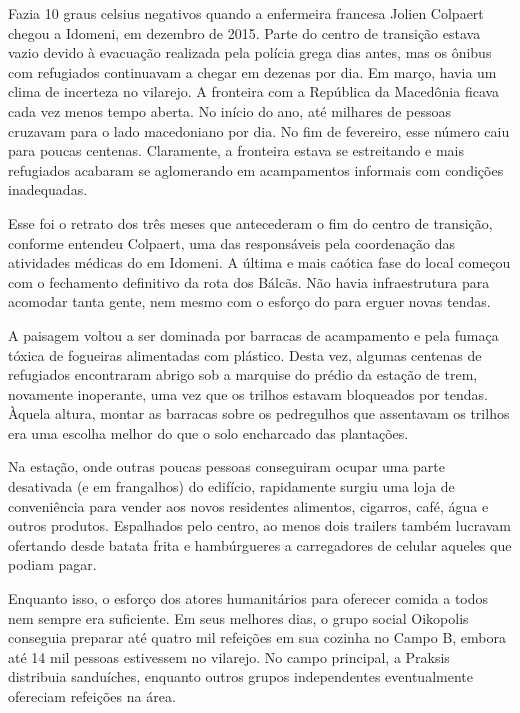 \putodd{}
\clearpage
{}
 

Fazia 10 graus celsius negativos quando a enfermeira francesa Jolien
Colpaert chegou a Idomeni, em dezembro de 2015. Parte do centro de
transição estava vazio devido à evacuação realizada pela polícia grega
dias antes, mas os ônibus com refugiados continuavam a chegar em dezenas
por dia. Em março, havia um clima de incerteza no vilarejo. 
A fronteira com a República da Macedônia ficava cada vez menos
tempo aberta. No início do ano, até milhares de pessoas cruzavam para o
lado macedoniano por dia. No fim de fevereiro, esse número caiu para
poucas centenas. Claramente, a fronteira estava se estreitando e mais
refugiados acabaram se aglomerando em acampamentos informais com
condições inadequadas.

Esse foi o retrato dos três meses que antecederam o fim do centro de
transição, conforme entendeu Colpaert, uma das responsáveis pela coordenação das
atividades médicas do  em Idomeni. A última e mais
caótica fase do local começou com o fechamento definitivo da rota
dos Bálcãs. Não havia infraestrutura para acomodar tanta gente, nem
mesmo com o esforço do  para erguer novas tendas.

A paisagem voltou a ser dominada por barracas de acampamento e pela
fumaça tóxica de fogueiras alimentadas com plástico. Desta
vez, algumas centenas de refugiados encontraram abrigo sob a marquise do
prédio da estação de trem, novamente inoperante, uma vez que os trilhos
estavam bloqueados por tendas. Àquela altura, montar as barracas sobre os pedregulhos que assentavam os trilhos era uma escolha melhor do que o solo encharcado das plantações. 

Na estação, onde outras poucas pessoas conseguiram ocupar uma parte
desativada (e em frangalhos) do edifício, rapidamente surgiu uma loja de
conveniência para vender aos novos residentes alimentos, cigarros, café,
água e outros produtos. Espalhados pelo centro, ao menos dois
trailers também lucravam ofertando desde batata frita e hambúrgueres a
carregadores de celular aqueles que podiam pagar.

Enquanto isso, o esforço dos atores humanitários para oferecer comida a todos
nem sempre era suficiente. Em seus melhores dias, o grupo social
Oikopolis conseguia preparar até quatro mil refeições em sua cozinha no
Campo B, embora até 14 mil pessoas estivessem no vilarejo. No campo
principal, a  Praksis distribuia sanduíches, enquanto outros grupos
independentes eventualmente ofereciam refeições na área.

